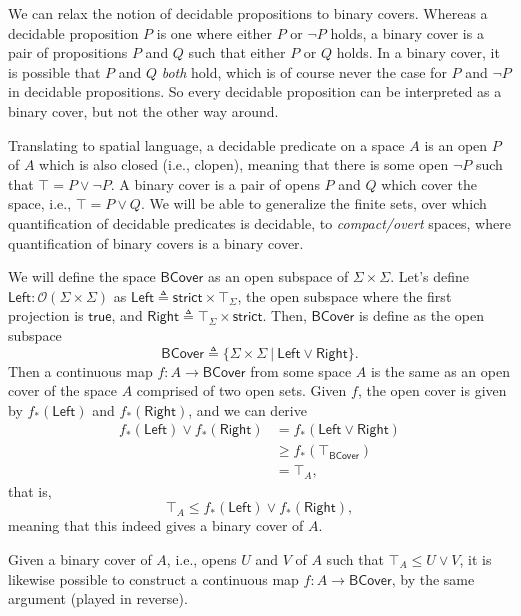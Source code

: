 \documentclass[conference]{IEEEtran}
\newcommand{\suchthat}{\ |\ }
\newcommand{\Open}[1]{\mathcal{O}({#1})}
\begin{document}
We can relax the notion of decidable propositions to binary covers. Whereas a decidable proposition $P$ is one where either $P$ or $\neg P$ holds, a binary cover is a pair of propositions $P$ and $Q$ such that either $P$ or $Q$ holds. In a binary cover, it is possible that $P$ and $Q$ \emph{both} hold, which is of course never the case for $P$ and $\neg P$ in decidable propositions. So every decidable proposition can be interpreted as a binary cover, but not the other way around.

Translating to spatial language, a decidable predicate on a space $A$ is an open $P$ of $A$ which is also closed (i.e., clopen), meaning that there is some open $\neg P$ such that $\top = P \vee \neg P$. A binary cover is a pair of opens $P$ and $Q$ which cover the space, i.e., $\top = P \vee Q$. We will be able to generalize the finite sets, over which quantification of decidable predicates is decidable, to \emph{compact/overt} spaces, where quantification of binary covers is a binary cover.

We will define the space $\mathsf{BCover}$ as an open subspace of $\Sigma \times \Sigma$. Let's define $\mathsf{Left} : \Open{\Sigma \times \Sigma}$ as $\mathsf{Left} \triangleq \mathsf{strict} \times \top_\Sigma$, the open subspace where the first projection is $\mathsf{true}$, and $\mathsf{Right} \triangleq \top_\Sigma \times \mathsf{strict}$. Then, $\mathsf{BCover}$ is define as the open subspace
\[
\mathsf{BCover} \triangleq \{ \Sigma \times \Sigma \suchthat \mathsf{Left} \vee \mathsf{Right} \}.
\]
Then a continuous map $f : A \to \mathsf{BCover}$ from some space $A$ is the same as an open cover of the space $A$ comprised of two open sets.  Given $f$, the open cover is given by $f_*(\mathsf{Left})$ and $f_*(\mathsf{Right})$, and we can derive
\begin{align*}
f_*(\mathsf{Left}) \vee f_*(\mathsf{Right})
&= f_*(\mathsf{Left} \vee \mathsf{Right})
\\ &\ge f_*\left (\top_\mathsf{BCover} \right)
\\ &= \top_A, %
\end{align*}
that is,
\[
\top_A \le f_*(\mathsf{Left}) \vee f_*(\mathsf{Right}),
\]
meaning that this indeed gives a binary cover of $A$.

Given a binary cover of $A$, i.e., opens $U$ and $V$ of $A$ such that $\top_A \le U \vee V$, it is likewise possible to construct a continuous map $f: A \to \mathsf{BCover}$, by the same argument (played in reverse).
\end{document}
